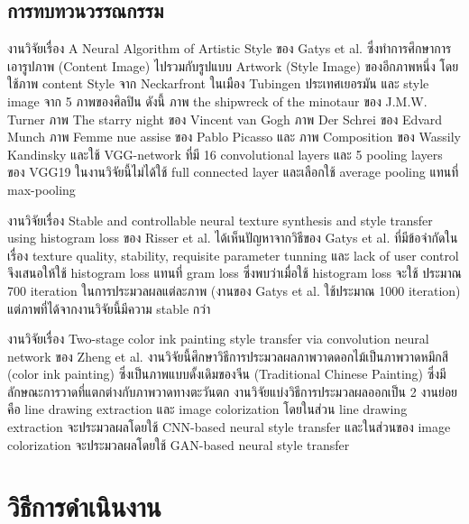\documentclass[12pt,oneside,openright,a4paper]{cpe-thai-project}
\begin{document}
\section{การทบทวนวรรณกรรม}
\par\setlength{\parindent}{5ex}
งานวิจัยเรื่อง A Neural Algorithm of Artistic Style ของ Gatys  et al.\cite{gatys2015neural} ซึ่งทำการศึกษาการเอารูปภาพ (Content Image) ไปรวมกับรูปแบบ Artwork (Style Image) ของอีกภาพหนึ่ง โดยใช้ภาพ content Style จาก Neckarfront ในเมือง Tubingen ประเทศเยอรมัน และ style image จาก 5 ภาพของศิลปิน ดังนี้ ภาพ the shipwreck of the minotaur ของ J.M.W. Turner ภาพ The starry night ของ Vincent van Gogh ภาพ Der Schrei ของ Edvard Munch ภาพ Femme nue assise ของ Pablo Picasso และ ภาพ Composition ของ Wassily Kandinsky  และใช้  VGG-network  ที่มี 16 convolutional layers และ 5 pooling layers ของ VGG19 ในงานวิจัยนี้ไม่ได้ใช้ full connected layer และเลือกใช้ average pooling แทนที่ max-pooling 
\par\setlength{\parindent}{5ex}
งานวิจัยเรื่อง Stable and controllable neural texture synthesis and style transfer using histogram loss ของ Risser et al. ได้เห็นปัญหาจากวิธีของ Gatys et al. ที่มีข้อจำกัดในเรื่อง texture quality, stability, requisite parameter tunning และ lack of user control จึงเสนอให้ใช้ histogram loss แทนที่ gram loss ซึ่งพบว่าเมื่อใช้ histogram loss จะใช้ ประมาณ 700 iteration ในการประมวลผลแต่ละภาพ  (งานของ Gatys et al. ใช้ประมาณ 1000 iteration) แต่ภาพที่ได้จากงานวิจัยนี้มีความ stable กว่า 
\par\setlength{\parindent}{5ex}
งานวิจัยเรื่อง Two-stage color ink painting style transfer via convolution neural network ของ Zheng et al.\cite{8636278} งานวิจัยนี้ศึกษาวิธีการประมวลผลภาพวาดดอกไม้เป็นภาพวาดหมึกสี (color ink painting) ซึ่งเป็นภาพแบบดั้งเดิมของจีน (Traditional Chinese Painting) ซึ่งมีลักษณะการวาดที่แตกต่างกับภาพวาดทางตะวันตก งานวิจัยแบ่งวิธีการประมวลผลออกเป็น 2 งานย่อย คือ line drawing extraction และ image colorization โดยในส่วน line drawing extraction จะประมวลผลโดยใช้ CNN-based neural style transfer และในส่วนของ image colorization จะประมวลผลโดยใช้ GAN-based neural style transfer


\newpage





\chapter{วิธีการดำเนินงาน}
\end{document}
